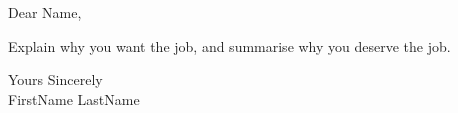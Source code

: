 \documentclass[a4paper,english]{friggeri-letter}
\begin{document}

\address{
	123 Fake St \\
	Australia
}


\opening{Dear Name,}

Explain why you want the job, and summarise why you deserve the job.

\closing{
   Yours Sincerely\\
   FirstName LastName
}
\end{document}
